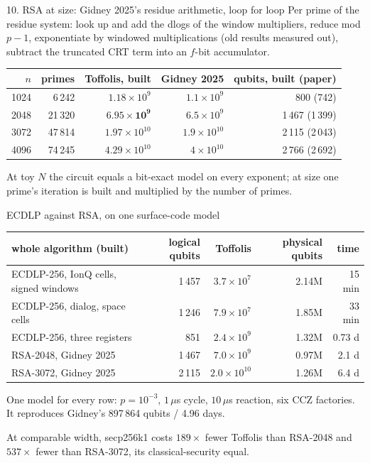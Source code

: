 \documentclass[aspectratio=169,11pt]{beamer}
\begin{document}
\begin{frame}{10. RSA at size: Gidney 2025's residue arithmetic, loop for loop}
  Per prime of the residue system: look up and add the dlogs of the window multipliers, reduce mod $p-1$, exponentiate by windowed multiplications (old results measured out), subtract the truncated CRT term into an $f$-bit accumulator.
  \vskip2mm
  \centering\small
  \renewcommand{\arraystretch}{1.15}
  \begin{tabular}{@{}rrrrr@{}}
    \toprule
    $n$ & primes & Toffolis, built & Gidney 2025 & qubits, built (paper) \\
    \midrule
    1024 & 6\,242 & $1.18\times10^9$ & $1.1\times10^9$ & 800 (742) \\
    2048 & 21\,320 & $\mathbf{6.95\times10^9}$ & $6.5\times10^9$ & 1\,467 (1\,399) \\
    3072 & 47\,814 & $1.97\times10^{10}$ & $1.9\times10^{10}$ & 2\,115 (2\,043) \\
    4096 & 74\,245 & $4.29\times10^{10}$ & $4\times10^{10}$ & 2\,766 (2\,692) \\
    \bottomrule
  \end{tabular}
  \vskip2mm
  \raggedright{\small At toy $N$ the circuit equals a bit-exact model on every exponent; at size one prime's iteration is built and multiplied by the number of primes.}
\end{frame}

\begin{frame}{ECDLP against RSA, on one surface-code model}
  \centering\small
  \renewcommand{\arraystretch}{1.15}
  \begin{tabular}{@{}lrrrr@{}}
    \toprule
    whole algorithm (built) & logical qubits & Toffolis & physical qubits & time \\
    \midrule
    ECDLP-256, IonQ cells, signed windows & 1\,457 & $3.7\times10^7$ & 2.14M & 15 min \\
    ECDLP-256, dialog, space cells & 1\,246 & $7.9\times10^7$ & 1.85M & 33 min \\
    ECDLP-256, three registers & 851 & $2.4\times10^9$ & 1.32M & 0.73 d \\
    RSA-2048, Gidney 2025 & 1\,467 & $7.0\times10^9$ & 0.97M & 2.1 d \\
    RSA-3072, Gidney 2025 & 2\,115 & $2.0\times10^{10}$ & 1.26M & 6.4 d \\
    \bottomrule
  \end{tabular}
  \vskip2mm
  \raggedright{\small One model for every row: $p=10^{-3}$, $1\,\mu$s cycle, $10\,\mu$s reaction, six CCZ factories. It reproduces Gidney's 897\,864 qubits / 4.96 days.}
  \begin{takeaway}At comparable width, secp256k1 costs $189\times$ fewer Toffolis than RSA-2048 and $537\times$ fewer than RSA-3072, its classical-security equal.\end{takeaway}
\end{frame}
\end{document}
